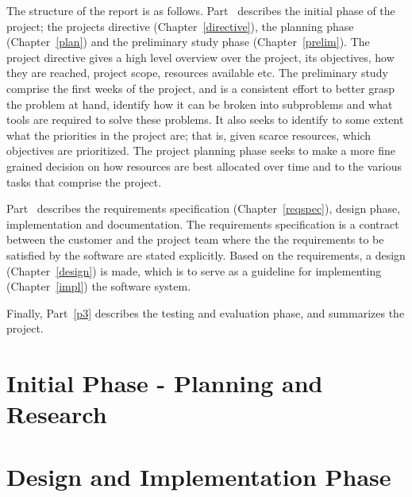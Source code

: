 \documentclass[11pt]{book}
\begin{document}
The structure of the report is as follows. Part~\ref{p1} describes the initial phase of the project; the projects directive (Chapter~\ref{directive}), the planning phase (Chapter~\ref{plan}) and the preliminary study phase (Chapter~\ref{prelim}). The project directive gives a high level overview over the project, its objectives, how they are reached, project scope, resources available etc. The preliminary study comprise the first weeks of the project, and is a consistent effort to better grasp the problem at hand, identify how it can be broken into subproblems and what tools are required to solve these problems. It also seeks to identify to some extent what the priorities in the project are; that is, given scarce resources, which objectives are prioritized. The project planning phase seeks to make a more fine grained decision on how resources are best allocated over time and to the various tasks that comprise the project.

Part~\ref{p2} describes the requirements specification (Chapter~\ref{reqspec}), design phase, implementation and documentation. The requirements specification is a contract between the customer and the project team where the the requirements to be satisfied by the software are stated explicitly. Based on the requirements, a design (Chapter~\ref{design}) is made, which is to serve as a guideline for implementing (Chapter~\ref{impl}) the software system.

Finally, Part~\ref{p3} describes the testing and evaluation phase, and summarizes the project.

\part{Initial Phase - Planning and Research}\label{p1}
\addtocounter{chapter}{1}
\setcounter{section}{0}


\setcounter{section}{0}
\addtocounter{chapter}{1}


\setcounter{section}{0}
\addtocounter{chapter}{1}


\part{Design and Implementation Phase}\label{p2}
\setcounter{section}{0}
\addtocounter{chapter}{1}


\setcounter{section}{0}
\addtocounter{chapter}{1}

\end{document}
